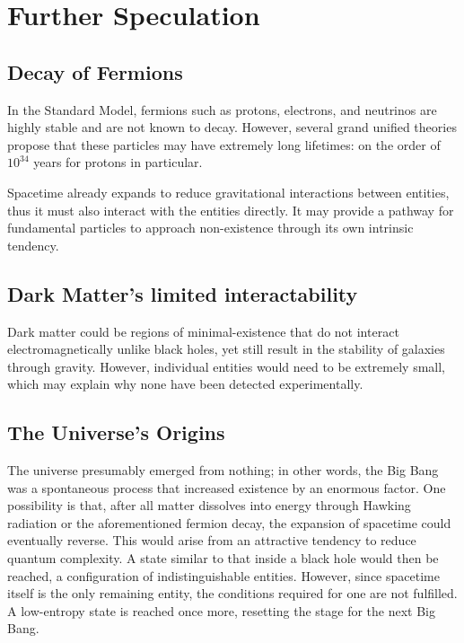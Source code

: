 \documentclass{article}
\begin{document}
\newpage
\section{Further Speculation}


\subsection{Decay of Fermions}

In the Standard Model, fermions such as protons, electrons, and neutrinos are highly stable and are not known to decay. 
However, several grand unified theories propose that these particles may have extremely long lifetimes: on the order of $10^{34}$ years for protons in particular.
 
Spacetime already expands to reduce gravitational interactions between entities, thus it must also interact with the entities directly.
It may provide a pathway for fundamental particles to approach non-existence through its own intrinsic tendency.


\subsection{Dark Matter's limited interactability}

Dark matter could be regions of minimal-existence that do not interact electromagnetically unlike black holes, yet still result in the stability of galaxies through gravity.
However, individual entities would need to be extremely small, which may explain why none have been detected experimentally.


\subsection{The Universe's Origins}

The universe presumably emerged from nothing; in other words, the Big Bang was a spontaneous process that increased existence by an enormous factor. 
One possibility is that, after all matter dissolves into energy through Hawking radiation or the aforementioned fermion decay, the expansion of spacetime could eventually reverse. 
This would arise from an attractive tendency to reduce quantum complexity. 
A state similar to that inside a black hole would then be reached, a configuration of indistinguishable entities. 
However, since spacetime itself is the only remaining entity, the conditions required for one are not fulfilled. 
A low-entropy state is reached once more, resetting the stage for the next Big Bang.



\newpage
\printbibliography
\end{document}
